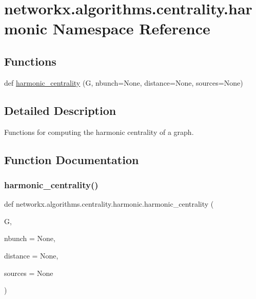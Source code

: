 \hypertarget{namespacenetworkx_1_1algorithms_1_1centrality_1_1harmonic}{}\section{networkx.\+algorithms.\+centrality.\+harmonic Namespace Reference}
\label{namespacenetworkx_1_1algorithms_1_1centrality_1_1harmonic}
\subsection*{Functions}
\begin{DoxyCompactItemize}
\item 
def \hyperlink{namespacenetworkx_1_1algorithms_1_1centrality_1_1harmonic_af9a051426c6eda5612ca2f661d7ddbd2}{harmonic\+\_\+centrality} (G, nbunch=None, distance=None, sources=None)
\end{DoxyCompactItemize}


\subsection{Detailed Description}
\begin{DoxyVerb}Functions for computing the harmonic centrality of a graph.\end{DoxyVerb}
 

\subsection{Function Documentation}
\mbox{\label{namespacenetworkx_1_1algorithms_1_1centrality_1_1harmonic_af9a051426c6eda5612ca2f661d7ddbd2}} 
\subsubsection{\texorpdfstring{harmonic\+\_\+centrality()}{harmonic\_centrality()}}
{\footnotesize\ttfamily def networkx.\+algorithms.\+centrality.\+harmonic.\+harmonic\+\_\+centrality (\begin{DoxyParamCaption}\item[{}]{G,  }\item[{}]{nbunch = {\ttfamily None},  }\item[{}]{distance = {\ttfamily None},  }\item[{}]{sources = {\ttfamily None} }\end{DoxyParamCaption})}


